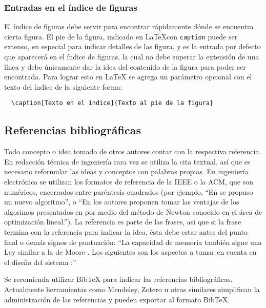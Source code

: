 \subsubsection{Entradas en el índice de figuras}

El índice de figuras debe servir para encontrar rápidamente dónde se
encuentra cierta figura.  El pie de la figura, indicado en \LaTeX con
\texttt{caption} puede ser extenso, en especial para indicar detalles
de las figura, y es la entrada por defecto que aparecerá en el índice
de figuras, la cual no debe superar la extensión de una línea y debe
únicamente dar la idea del contenido de la figura para poder ser
encontrada.  Para lograr esto en \LaTeX{} se agrega un parámetro
opcional con el texto del índice de la siguiente forma:
\begin{verbatim}
  \caption[Texto en el índice]{Texto al pie de la figura}
\end{verbatim}

\subsection{Referencias bibliográficas}

Todo concepto o idea tomado de otros autores contar con la respectiva
referencia. En redacción técnica de ingeniería rara vez se utiliza la cita
textual, así que es necesario reformular las ideas y conceptos con palabras
propias. En ingeniería electrónica se utilizan los formatos de referencia de la
IEEE o la ACM, que son numéricos, encerrados entre paréntesis cuadrados (por
ejemplo, ``En \cite{Davis1963} se propuso un nuevo algoritmo'', o ``En
\cite{ProakisManolakis1998} los autores proponen tomar las ventajas de los
algorimos presentados en \cite{Oppenheim1998,Roberts2005,Haykin2001} por medio
del método de Newton \cite{Burrus1998} conocido en el área de optimización
lineal.''). La referencia es parte de las frases, así que si la frase termina
con la referencia para indicar la idea, ésta debe estar antes del punto final o
demás signos de puntuación: ``La capacidad de memoria también sigue una Ley
similar a la de Moore \cite{Octave}. Los siguientes son los aspectos a tomar en
cuenta en el diseño del sistema \cite{Lindner2002}:''

Se recomienda utilizar BibTeX para indicar las referencias
bibliográficas.  Actualmente herramientas como Mendeley, Zotero u
otras similares simplifican la administración de las referencias y
pueden exportar al formato BibTeX.

